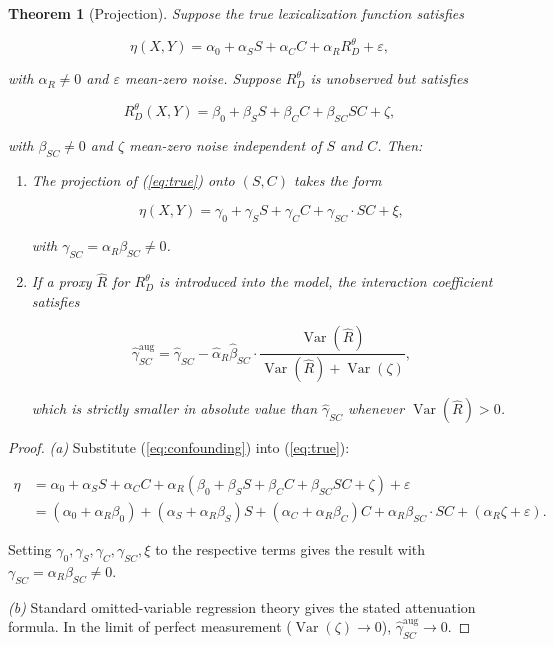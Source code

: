 \documentclass[12pt]{article}
\theoremstyle{rthm}
\newtheorem{theorem}{Theorem}[section]
\theoremstyle{rdef}
\theoremstyle{remark}
\newcommand{\RD}[1][\theta]{R_{D}^{#1}}
\begin{document}
\begin{theorem}[Projection]
\label{thm:projection}
Suppose the true lexicalization function satisfies

\begin{equation}
\label{eq:true}
\eta(X,Y) = \alpha_0 + \alpha_S S + \alpha_C C + \alpha_R \RD + \varepsilon,
\end{equation}

with $\alpha_R \neq 0$ and $\varepsilon$ mean-zero noise. Suppose $\RD$ is
unobserved but satisfies

\begin{equation}
\label{eq:confounding}
\RD(X,Y) = \beta_0 + \beta_S S + \beta_C C + \beta_{SC} SC + \zeta,
\end{equation}

with $\beta_{SC} \neq 0$ and $\zeta$ mean-zero noise independent of $S$ and $C$.
Then:
\begin{enumerate}[label=(\alph*)]
  \item The projection of (\ref{eq:true}) onto $(S, C)$ takes the form

    \[
    \eta(X,Y) = \gamma_0 + \gamma_S S + \gamma_C C
               + \gamma_{SC} \cdot SC + \xi,
    \]

    with $\gamma_{SC} = \alpha_R \beta_{SC} \neq 0$.

  \item If a proxy $\widehat{R}$ for $\RD$ is introduced into the model, the
    interaction coefficient satisfies

    \[
    \hat{\gamma}_{SC}^{\mathrm{aug}} = \hat{\gamma}_{SC}
    - \hat{\alpha}_R \hat{\beta}_{SC}
    \cdot \frac{\operatorname{Var}(\widehat{R})}
               {\operatorname{Var}(\widehat{R}) + \operatorname{Var}(\zeta)},
    \]

    which is strictly smaller in absolute value than $\hat{\gamma}_{SC}$
    whenever $\operatorname{Var}(\widehat{R}) > 0$.
\end{enumerate}
\end{theorem}

\begin{proof}
\emph{(a)} Substitute (\ref{eq:confounding}) into (\ref{eq:true}):

\begin{align*}
\eta &= \alpha_0 + \alpha_S S + \alpha_C C
      + \alpha_R(\beta_0 + \beta_S S + \beta_C C + \beta_{SC} SC + \zeta)
      + \varepsilon \\
     &= (\alpha_0 + \alpha_R\beta_0)
      + (\alpha_S + \alpha_R\beta_S)S
      + (\alpha_C + \alpha_R\beta_C)C
      + \alpha_R\beta_{SC} \cdot SC
      + (\alpha_R\zeta + \varepsilon).
\end{align*}

Setting $\gamma_0, \gamma_S, \gamma_C, \gamma_{SC}, \xi$ to the respective
terms gives the result with $\gamma_{SC} = \alpha_R\beta_{SC} \neq 0$.

\emph{(b)} Standard omitted-variable regression theory gives the stated
attenuation formula. In the limit of perfect measurement ($\operatorname{Var}(\zeta)
\to 0$), $\hat{\gamma}_{SC}^{\mathrm{aug}} \to 0$.
\end{proof}
\end{document}
